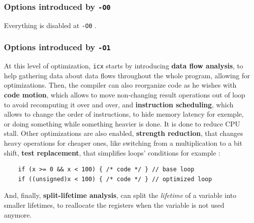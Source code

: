 \documentclass{rapport}
\newcommand{\icx}{\texttt{icx} }
\newcommand{\optizero}{\texttt{-O0} }
\newcommand{\optione}{\texttt{-O1} }
\begin{document}
\subsubsection{Options introduced by \optizero}
Everything is disabled at \optizero.
\subsubsection{Options introduced by \optione}
At this level of optimization, \icx starts by introducing \textbf{data flow analysis}, to help gathering data about data flows throughout the whole program, 
allowing for optimizations.\newline
Then, the compiler can also reorganize code as he wishes with \textbf{code motion}, which allows to move non-changing result operations out of loop to avoid 
recomputing it over and over, and \textbf{instruction scheduling}, which allows to change the order of instructions, to hide memory latency for exemple, 
or doing something while something heavier is done. It is done to reduce CPU stall.
\newline\newline
Other optimizations are also enabled, \textbf{strength reduction}, that changes heavy operations for cheaper ones, like switching from a multiplication to a bit shift, \textbf{test replacement}, that simplifies loops' conditions for example : 
\begin{verbatim}
    if (x >= 0 && x < 100) { /* code */ } // base loop
    if ((unsigned)x < 100) { /* code */ } // optimized loop
\end{verbatim}
And, finally, \textbf{split-lifetime analysis}, can split the \textit{lifetime} of a variable into smaller lifetimes, to reallocate the registers when the variable is not used anymore.
\end{document}

